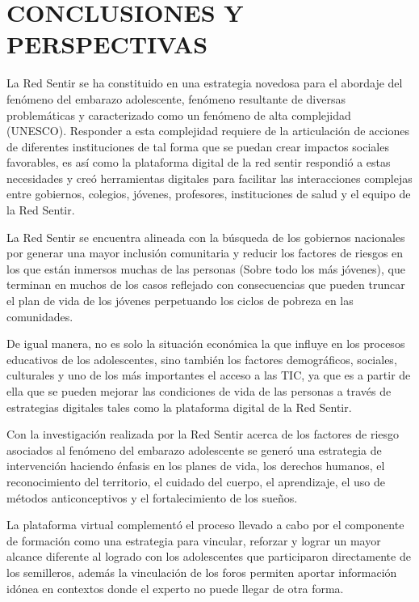 \documentclass[journal,transmag]{IEEEtran}
\begin{document}
\section{CONCLUSIONES Y PERSPECTIVAS}\label{sec:conclusiones}
La Red Sentir se ha constituido en una estrategia novedosa para el abordaje del fenómeno del embarazo adolescente, fenómeno resultante de diversas problemáticas y caracterizado como un fenómeno de alta complejidad (UNESCO). Responder a esta complejidad requiere de la articulación de acciones de diferentes instituciones de tal forma que se puedan crear impactos sociales favorables, es así como la plataforma digital de la red sentir respondió a estas necesidades y creó herramientas digitales para facilitar las interacciones complejas entre gobiernos, colegios, jóvenes, profesores, instituciones de salud y el equipo de la Red Sentir.

La Red Sentir se encuentra alineada con la búsqueda de los gobiernos nacionales por generar una mayor inclusión comunitaria y reducir los factores de riesgos en los que están inmersos muchas de las personas (Sobre todo los más jóvenes), que terminan en muchos de los casos reflejado con consecuencias que pueden truncar el plan de vida de los jóvenes perpetuando los ciclos de pobreza en las comunidades. 

De igual manera, no es solo la situación económica la que influye en los procesos educativos de los adolescentes, sino también  los factores demográficos, sociales, culturales y uno de los más importantes el acceso a las TIC, ya que es a partir de ella que se pueden mejorar las condiciones de vida de las personas a través de estrategias digitales tales como la plataforma digital de la Red Sentir.

Con la investigación realizada por la Red Sentir acerca de los factores de riesgo asociados al fenómeno del embarazo adolescente se generó una estrategia de intervención haciendo énfasis en los planes de vida, los derechos humanos, el reconocimiento del territorio, el cuidado del cuerpo, el aprendizaje, el uso de métodos anticonceptivos y el fortalecimiento de los sueños.

La plataforma virtual complementó el proceso llevado a cabo por el componente de formación como una estrategia para vincular, reforzar y lograr un mayor alcance diferente al logrado con los adolescentes que participaron directamente de los semilleros, además la vinculación de los foros permiten aportar información idónea en contextos donde el experto no puede llegar de otra forma.
\end{document}

